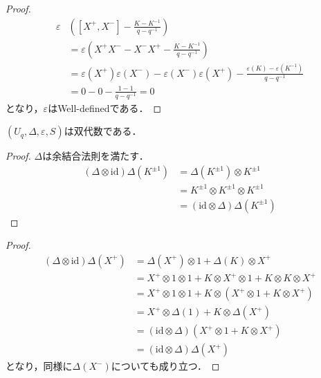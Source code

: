 \documentclass[10pt,dvipdfm]{beamer}
\begin{document}
  \begin{frame}
    \begin{proof}
      \begin{align*}
        \varepsilon&\left([X^+,X^-] - \frac{K-K^{-1}}{q-q^{-1}}\right)\\
        &= \varepsilon\left(X^+X^- - X^-X^+ - \frac{K-K^{-1}}{q-q^{-1}}\right)\\
        &= \varepsilon(X^+)\varepsilon(X^-) - \varepsilon(X^-)\varepsilon(X^+) - \frac{\varepsilon(K)-\varepsilon(K^{-1})}{q-q^{-1}}\\
        &= 0 - 0 - \frac{1-1}{q-q^{-1}} = 0
      \end{align*}
      となり，$\varepsilon$はWell-definedである．
    \end{proof}
  \end{frame}
  \begin{frame}
    \begin{theorem}
      $(U_q,\Delta,\varepsilon,S)$は双代数である．
    \end{theorem}
    \begin{proof}
      $\Delta$は余結合法則を満たす．
      \begin{align*}
        (\Delta\otimes\text{id})\Delta(K^{\pm1}) &= \Delta(K^{\pm1})\otimes K^{\pm1}\\
        &= K^{\pm1}\otimes K^{\pm1}\otimes K^{\pm1}\\
        &= (\text{id}\otimes\Delta)\Delta(K^{\pm1})
      \end{align*}
      \let\qedsymbol\relax
    \end{proof}
  \end{frame}
  \begin{frame}
    \begin{proof}
      \begin{align*}
        (\Delta\otimes\text{id})\Delta(X^+) &= \Delta(X^+)\otimes 1 + \Delta(K)\otimes X^+\\
        &= X^+\otimes 1\otimes 1 + K\otimes X^+\otimes 1 + K\otimes K\otimes X^+\\
        &= X^+\otimes 1\otimes 1 + K\otimes (X^+\otimes 1 + K\otimes X^+)\\
        &= X^+\otimes \Delta(1) + K\otimes \Delta(X^+)\\
        &= (\text{id}\otimes\Delta)(X^+\otimes 1 + K\otimes X^+)\\
        &= (\text{id}\otimes\Delta)\Delta(X^+)
      \end{align*}
      となり，同様に$\Delta(X^-)$についても成り立つ．
      \let\qedsymbol\relax
    \end{proof}
  \end{frame}
\end{document}
